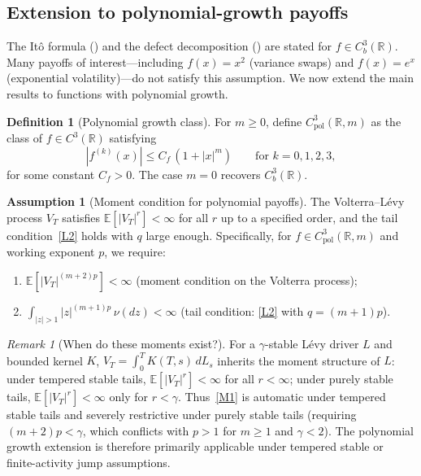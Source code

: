 \documentclass[11pt,a4paper]{article}
\theoremstyle{plain}
\theoremstyle{definition}
\newtheorem{definition}[theorem]{Definition}
\newtheorem{assumption}[theorem]{Assumption}
\theoremstyle{remark}
\newtheorem{remark}[theorem]{Remark}
\newcommand{\E}{\mathbb{E}}
\newcommand{\R}{\mathbb{R}}
\begin{document}
\subsection{Extension to polynomial-growth payoffs}
\label{sec:poly-growth}

The It\^o formula () and the defect
decomposition () are stated
for $f \in C_b^3(\R)$.  Many payoffs of interest---including
$f(x) = x^2$ (variance swaps) and $f(x) = e^x$
(exponential volatility)---do not satisfy this assumption.
We now extend the main results to functions with polynomial
growth.

\begin{definition}[Polynomial growth class]\label{def:poly-growth}
For $m \geq 0$, define $C_{\mathrm{pol}}^3(\R,m)$ as the
class of $f \in C^3(\R)$ satisfying
\[
  |f^{(k)}(x)| \leq C_f\,(1 + |x|^m)
  \qquad \text{for }k = 0,1,2,3,
\]
for some constant $C_f > 0$.  The case $m = 0$ recovers
$C_b^3(\R)$.
\end{definition}

\begin{assumption}[Moment condition for polynomial payoffs]
\label{ass:moments-poly}
The Volterra--L\'evy process $V_T$ satisfies
$\E[|V_T|^r] < \infty$ for all $r$ up to a specified order,
and the tail condition~\ref{L2} holds with $q$ large
enough.  Specifically, for $f \in C_{\mathrm{pol}}^3(\R,m)$
and working exponent $p$, we require:
\begin{enumerate}[label=(M\arabic*)]
\item\label{M1} $\E[|V_T|^{(m+2)p}] < \infty$
  (moment condition on the Volterra process);
\item\label{M2} $\int_{|z|>1}|z|^{(m+1)p}\,\nu(dz) < \infty$
  (tail condition: \ref{L2} with $q = (m+1)p$).
\end{enumerate}
\end{assumption}

\begin{remark}[When do these moments exist?]\label{rem:VT-moments}
For a $\gamma$-stable L\'evy driver $L$ and bounded kernel $K$,
$V_T = \int_0^T K(T,s)\,dL_s$ inherits the moment structure of
$L$: under tempered stable tails, $\E[|V_T|^r] < \infty$ for
all $r < \infty$; under purely stable tails, $\E[|V_T|^r] < \infty$
only for $r < \gamma$.  Thus~\ref{M1} is automatic under tempered
stable tails and severely restrictive under purely stable tails
(requiring $(m+2)p < \gamma$, which conflicts with $p > 1$ for
$m \geq 1$ and $\gamma < 2$).  The polynomial growth extension
is therefore primarily applicable under tempered stable or
finite-activity jump assumptions.
\end{remark}
\end{document}
